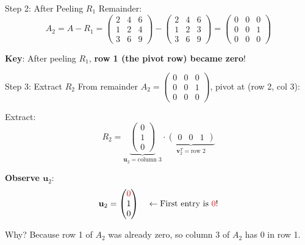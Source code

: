 \documentclass[10pt]{beamer}
\theoremstyle{definition}
\newcommand{\x}[1]{\alert{\textbf{#1}}}
\begin{document}
\begin{frame}[fragile]{Step 2: After Peeling $R_1$}
Remainder:
$$A_2 = A - R_1 = \begin{pmatrix} 2 & 4 & 6 \\ 1 & 2 & 4 \\ 3 & 6 & 9 \end{pmatrix} - \begin{pmatrix} 2 & 4 & 6 \\ 1 & 2 & 3 \\ 3 & 6 & 9 \end{pmatrix} = \begin{pmatrix} 0 & 0 & 0 \\ 0 & 0 & 1 \\ 0 & 0 & 0 \end{pmatrix}$$

\vfill
\begin{center}
\end{center}

\vfill
\x{Key}: After peeling $R_1$, \x{row 1 (the pivot row) became zero}!
\end{frame}

\begin{frame}[fragile]{Step 3: Extract $R_2$}
From remainder $A_2 = \begin{pmatrix} 0 & 0 & 0 \\ 0 & 0 & 1 \\ 0 & 0 & 0 \end{pmatrix}$, pivot at (row 2, col 3):

\vfill
Extract:
$$R_2 = \underbrace{\begin{pmatrix} 0 \\ 1 \\ 0 \end{pmatrix}}_{\mathbf{u}_2 = \text{column 3}} \cdot \underbrace{\begin{pmatrix} 0 & 0 & 1 \end{pmatrix}}_{\mathbf{v}_2^T = \text{row 2}}$$

\vfill
\x{Observe $\mathbf{u}_2$}:
$$\mathbf{u}_2 = \begin{pmatrix} \textcolor{red}{0} \\ 1 \\ 0 \end{pmatrix} \quad \leftarrow \text{First entry is \textcolor{red}{0}}!$$

\vfill
Why? Because row 1 of $A_2$ was already zero, so column 3 of $A_2$ has 0 in row 1.
\end{frame}
\end{document}
